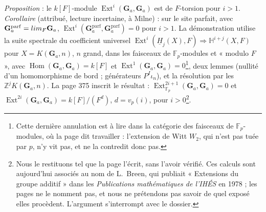 \documentclass[11pt,a4paper]{article}
\begin{document}
\emph{Proposition} : le $k[F]$-module $\operatorname{Ext}^i(\mathbf{G}_a,
\mathbf{G}_a)$ est de $F$-torsion pour $i > 1$. \emph{Corollaire} (attribué,
lecture incertaine, à Milne) : sur le site parfait, avec $\mathbf{G}_a^{\mathrm{parf}}
= \varinjlim_F \mathbf{G}_a$, $\operatorname{Ext}^i(\mathbf{G}_a^{\mathrm{parf}},
\mathbf{G}_a^{\mathrm{parf}}) = 0$ pour $i > 1$. La démonstration utilise la suite
spectrale du coefficient universel $\operatorname{Ext}^i(\underline{H}_j(X), F)
\Rightarrow \mathbb{H}^{i+j}(X, F)$ pour $X = K(\mathbf{G}_a, n)$, $n$ grand, dans
les faisceaux de $\mathbb{F}_p$-modules et « modulo $F$ », avec $\operatorname{Hom}
(\mathbf{G}_a, \mathbf{G}_a) = k[F]$ et $\operatorname{Ext}^1(\mathbf{G}_a, \mathbf{G}_a)
= 0$\footnote{Cette dernière annulation est à lire dans la catégorie des faisceaux
de $\mathbb{F}_p$-modules, où la page dit travailler : l'extension de Witt $W_2$,
qui n'est pas tuée par $p$, n'y vit pas, et ne la contredit donc pas.}, deux
lemmes (nullité d'un homomorphisme de bord ; générateurs $P^I\iota_n$), et la
résolution par les $\mathbb{Z}^jK(\mathbf{G}_a, n)$. La page 375 inscrit le
résultat : $\operatorname{Ext}^{2i+1}_{\mathbb{F}_p}(\mathbf{G}_a, \mathbf{G}_a) = 0$
et $\operatorname{Ext}^{2i}(\mathbf{G}_a, \mathbf{G}_a) = k[F]/(F^d)$, $d =
v_p(i)$, pour $i > 0$\footnote{Nous le restituons tel que la page l'écrit, sans
l'avoir vérifié. Ces calculs sont aujourd'hui associés au nom de L.~Breen, qui
publiait « Extensions du groupe additif » dans les \emph{Publications
mathématiques de l'IHÉS} en 1978 ; les pages ne le nomment pas, et nous ne
prétendons pas savoir de quel exposé elles procèdent. L'argument s'interrompt
avec le dossier.}.
\end{document}
